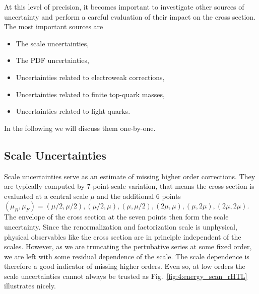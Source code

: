 At this level of precision, it becomes important to investigate other sources of uncertainty and perform a careful evaluation of their impact on the cross section. The most important sources are
\begin{itemize}
  \item The scale uncertainties,
  \item The \acs{PDF} uncertainties,
  \item Uncertainties related to electroweak corrections,
  \item Uncertainties related to finite top-quark masses,
  \item Uncertainties related to light quarks.
\end{itemize}
In the following we will discuss them one-by-one.

\subsection{Scale Uncertainties} \label{subsec:4:scale_uncertainties}
Scale uncertainties serve as an estimate of missing higher order corrections. They are typically computed by 7-point-scale variation, that means the cross section is evaluated at a central scale $\mu$ and the additional 6 points $(\mu_R, \mu_F) = (\mu/2, \mu/2), (\mu/2, \mu), (\mu, \mu/2), (2 \mu, \mu), (\mu, 2 \mu), (2 \mu, 2 \mu)$. The envelope of the cross section at the seven points then form the scale uncertainty. Since the renormalization and factorization scale is unphysical, physical observables like the cross section are in principle independent of the scales. However, as we are truncating the pertubative series at some fixed order, we are left with some residual dependence of the scale. The scale dependence is therefore a good indicator of missing higher orders. Even so, at low orders the scale uncertainties cannot always be trusted as Fig.~\ref{fig:4:energy_scan_rHTL} illustrates nicely.

